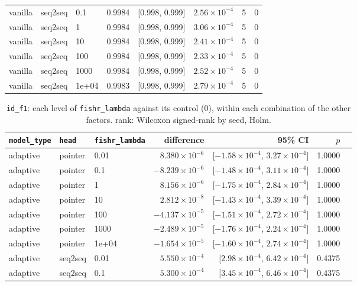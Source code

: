 \documentclass[10pt]{article}
\begin{document}
{\begin{longtable}{lllrlrrr}
vanilla & seq2seq & 0.1 & 0.9984 & [0.998, 0.999] & $2.56\times10^{-4}$ & 5 & 0\\
vanilla & seq2seq & 1 & 0.9984 & [0.998, 0.999] & $3.06\times10^{-4}$ & 5 & 0\\
vanilla & seq2seq & 10 & 0.9984 & [0.998, 0.999] & $2.41\times10^{-4}$ & 5 & 0\\
vanilla & seq2seq & 100 & 0.9984 & [0.998, 0.999] & $2.33\times10^{-4}$ & 5 & 0\\
vanilla & seq2seq & 1000 & 0.9984 & [0.998, 0.999] & $2.52\times10^{-4}$ & 5 & 0\\
vanilla & seq2seq & 1e+04 & 0.9983 & [0.998, 0.999] & $2.79\times10^{-4}$ & 5 & 0\\
\bottomrule
\end{longtable}
}

{\small
\begin{longtable}{lllrrrl}
\caption{\texttt{id\_f1}: each level of \texttt{fishr\_lambda} against its control (0), within each combination of the other factors. rank: Wilcoxon signed-rank by seed, Holm.}\label{tab:control-id_f1}\\
\toprule
\texttt{model\_type} & \texttt{head} & \texttt{fishr\_lambda} & difference & 95\% CI & $p$ & \\
\midrule
\endhead
adaptive & pointer & 0.01 & $8.380\times10^{-6}$ & [$-1.58\times10^{-4}$, $3.27\times10^{-4}$] & 1.0000 & \\
adaptive & pointer & 0.1 & $-8.239\times10^{-6}$ & [$-1.48\times10^{-4}$, $3.11\times10^{-4}$] & 1.0000 & \\
adaptive & pointer & 1 & $8.156\times10^{-6}$ & [$-1.75\times10^{-4}$, $2.84\times10^{-4}$] & 1.0000 & \\
adaptive & pointer & 10 & $2.812\times10^{-8}$ & [$-1.43\times10^{-4}$, $3.39\times10^{-4}$] & 1.0000 & \\
adaptive & pointer & 100 & $-4.137\times10^{-5}$ & [$-1.51\times10^{-4}$, $2.72\times10^{-4}$] & 1.0000 & \\
adaptive & pointer & 1000 & $-2.489\times10^{-5}$ & [$-1.76\times10^{-4}$, $2.24\times10^{-4}$] & 1.0000 & \\
adaptive & pointer & 1e+04 & $-1.654\times10^{-5}$ & [$-1.60\times10^{-4}$, $2.74\times10^{-4}$] & 1.0000 & \\
adaptive & seq2seq & 0.01 & $5.550\times10^{-4}$ & [$2.98\times10^{-4}$, $6.42\times10^{-4}$] & 0.4375 & \\
adaptive & seq2seq & 0.1 & $5.300\times10^{-4}$ & [$3.45\times10^{-4}$, $6.46\times10^{-4}$] & 0.4375 & \\

\end{longtable}}
\end{document}
